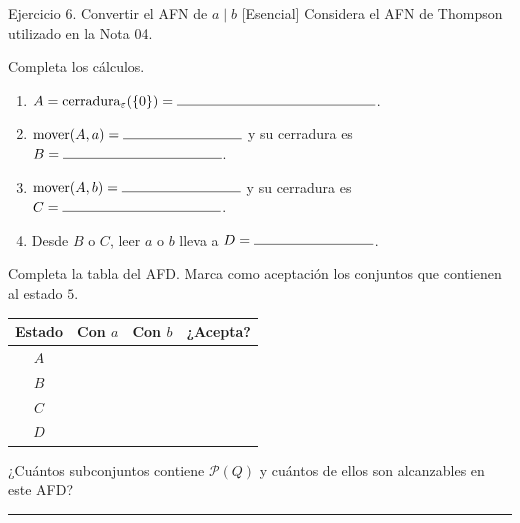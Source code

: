 \documentclass[11pt,spanish]{article}
\newcommand{\blank}[1][4cm]{\rule{#1}{0.4pt}}
\newcommand{\espaciosalida}{0.10cm}
\newcommand{\espaciosalida}{0.60cm}
\begin{document}
\begin{ejercicio}{Ejercicio 6. Convertir el AFN de \(a\mid b\) \hfill {\small [Esencial]}}
Considera el AFN de Thompson utilizado en la Nota 04.

\begin{center}
\end{center}

Completa los cálculos.

\begin{enumerate}[leftmargin=*]
    \item \(A=\operatorname{cerradura}_{\varepsilon}(\{0\})=\blank[5cm]\).
    \item \(\operatorname{mover}(A,a)=\blank[3cm]\) y su cerradura es \(B=\blank[4cm]\).
    \item \(\operatorname{mover}(A,b)=\blank[3cm]\) y su cerradura es \(C=\blank[4cm]\).
    \item Desde \(B\) o \(C\), leer \(a\) o \(b\) lleva a \(D=\blank[3cm]\).
\end{enumerate}

Completa la tabla del AFD. Marca como aceptación los conjuntos que contienen al estado \(5\).

\begin{center}
\small
\renewcommand{\arraystretch}{1.25}
\begin{tabular}{|c|c|c|c|}
\hline
\textbf{Estado} & \textbf{Con \(a\)} & \textbf{Con \(b\)} & \textbf{¿Acepta?} \tabularnewline
\hline
\(A\) & & & \tabularnewline[\espaciosalida]
\hline
\(B\) & & & \tabularnewline[\espaciosalida]
\hline
\(C\) & & & \tabularnewline[\espaciosalida]
\hline
\(D\) & & & \tabularnewline[\espaciosalida]
\hline
\end{tabular}
\end{center}

¿Cuántos subconjuntos contiene \(\mathcal{P}(Q)\) y cuántos de ellos son alcanzables en este AFD?

\ifrespuestas\else
\blank[14cm]
\fi
\end{ejercicio}
\end{document}

